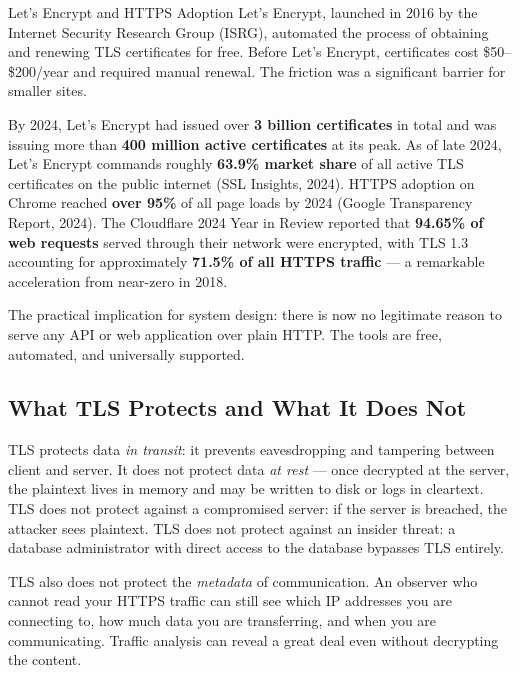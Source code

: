 \documentclass[11pt,a4paper]{article}
\begin{document}
\begin{industrybox}{Let's Encrypt and HTTPS Adoption}
Let's Encrypt, launched in 2016 by the Internet Security Research Group (ISRG), automated the process of obtaining and renewing TLS certificates for free. Before Let's Encrypt, certificates cost \$50--\$200/year and required manual renewal. The friction was a significant barrier for smaller sites.

By 2024, Let's Encrypt had issued over \textbf{3 billion certificates} in total and was issuing more than \textbf{400 million active certificates} at its peak. As of late 2024, Let's Encrypt commands roughly \textbf{63.9\% market share} of all active TLS certificates on the public internet (SSL Insights, 2024). HTTPS adoption on Chrome reached \textbf{over 95\%} of all page loads by 2024 (Google Transparency Report, 2024). The Cloudflare 2024 Year in Review reported that \textbf{94.65\% of web requests} served through their network were encrypted, with TLS 1.3 accounting for approximately \textbf{71.5\% of all HTTPS traffic} --- a remarkable acceleration from near-zero in 2018.

The practical implication for system design: there is now no legitimate reason to serve any API or web application over plain HTTP. The tools are free, automated, and universally supported.
\end{industrybox}

\subsection{What TLS Protects and What It Does Not}

TLS protects data \textit{in transit}: it prevents eavesdropping and tampering between client and server. It does not protect data \textit{at rest} --- once decrypted at the server, the plaintext lives in memory and may be written to disk or logs in cleartext. TLS does not protect against a compromised server: if the server is breached, the attacker sees plaintext. TLS does not protect against an insider threat: a database administrator with direct access to the database bypasses TLS entirely.

TLS also does not protect the \textit{metadata} of communication. An observer who cannot read your HTTPS traffic can still see which IP addresses you are connecting to, how much data you are transferring, and when you are communicating. Traffic analysis can reveal a great deal even without decrypting the content.
\end{document}
